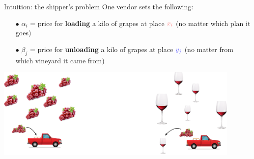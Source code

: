 \documentclass[pdf,aspectratio=169,10pt]{beamer}
\begin{document}
\begin{frame}{Intuition: the shipper's problem}
One vendor sets the following:
\begin{itemize}
\item[$\bullet$] $\alpha_i$ = price for \textbf{loading} a kilo of grapes at place $\er{x_i}$ (no matter which plan it goes)
\item[$\bullet$] $\beta_j$ = price for \textbf{unloading} a kilo of grapes at place $\eb{y_j}$ (no matter from which vineyard it came from)
\end{itemize}

\begin{center}
\includegraphics[width=0.9\textwidth]{../img/wine_load2.pdf}
\end{center}

\end{frame}
\end{document}
